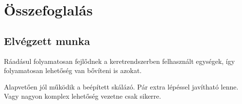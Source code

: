 \chapter{Összefoglalás}
\label{sec:summary}


\section{Elvégzett munka}




Ráadásul folyamatosan fejlődnek a keretrendszerben felhasznált egységek, így folyamatosan lehetőség van bővíteni is azokat.

Alapvetően jól működik a beépített skálázó.
Pár extra lépéssel javítható lenne.
Vagy nagyon komplex lehetőség vezetne csak sikerre.


